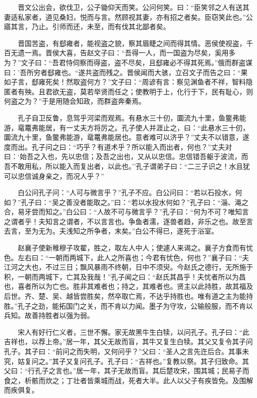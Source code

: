 　　晋文公出会，欲伐卫，公子锄仰天而笑。公问何笑。曰：``臣笑邻之人有送其妻适私家者，道见桑妇，悦而与言。然顾视其妻，亦有招之者矣。臣窃笑此也。''公寤其言，乃止。引师而还，未至，而有伐其北鄙者矣。

　　晋国苦盗，有郄雍者，能视盗之貌，察其眉睫之间而得其情。恶侯使视盗，千百无遗一焉。晋侯大喜，告赵文子曰：``吾得一人，而一国盗为尽矣，奚用多为？''文子曰：``吾君恃伺察而得盗，盗不尽矣，且郄雍必不得其死焉。''俄而群盗谋曰：'吾所穷者郄雍也。``遂共盗而残之。晋侯闻而大骇，立召文子而告之曰：``果如子言，郄雍死矣！然取盗何方？''文子曰：``周谚有言：察见渊鱼者不祥，智料隐匿者有殃。且君欲无盗，莫若举贤而任之；使教明于上，化行于下，民有耻心，则何盗之为？''于是用随会知政，而群盗奔秦焉。

　　孔子自卫反鲁，息驾乎河梁而观焉。有悬水三十仞，圜流九十里，鱼鳖弗能游，鼋鼍弗能居，有一丈夫方将厉之。孔子使人并涯止之，曰：``此悬水三十仞，圜流九十里，鱼鳖弗能游，鼋鼍弗能居也。意者难可以济乎？''丈夫不以错意，遂度而出。孔子问之曰：``巧乎？有道术乎？所以能入而出者，何也？''丈夫对曰：`始吾之入也，先以忠信；及吾之出也，又从以忠信。忠信错吾躯于波流，而吾不敢用私，所以能入而复出者，以此也。''孔子谓弟子曰：``二三子识之！水且犹可以忠信诚身亲之，而况人乎？''

　　白公问孔子问：``人可与微言乎？''孔子不应。白公问曰：``若以石投水，何如？''孔子曰：``吴之善没者能取之。''曰：``若以水投水何如？''孔子曰：``淄、渑之合，易牙尝而知之。''白公曰：``人故不可与微言乎？''孔子曰：``何为不可？唯知言之谓者乎！夫知言之谓者，不以言言也。争鱼者濡，逐兽者趋，非乐之也。故至言去言，至为无为。夫浅知之所争者，末矣。''白公不得已，遂死于浴室。

　　赵襄子使新稚穆子攻翟，胜之，取左人中人；使遽人来谒之。襄子方食而有忧色。左右曰：``一朝而两城下，此人之所喜也；今君有忧色，何也？''襄子曰：``夫江河之大也，不过三日；飘风暴雨不终朝，日中不须臾。今赵氏之德行，无所施于积，一朝而两城下，亡其及我哉！''孔子闻之曰：``赵氏其昌乎！夫忧者所以为昌也，喜者所以为亡也。胜非其难者也；持之，其难者也。贤主以此持胜，故其福及后世。齐、楚、吴、越皆尝胜矣，然卒取亡焉，不达乎持胜也。唯有道之主为能持胜。''孔子之劲，能拓国门之关，而不肯以力闻。墨子为守攻，公输般服，而不肯以兵知。故善持胜者以强为弱。

　　宋人有好行仁义者，三世不懈。家无故黑牛生白犊，以问孔子。孔子曰：``此吉祥也，以荐上帝。''居一年，其父无故而盲，其牛又复生白犊。其父又复令其子问孔子。其子曰：``前问之而失明，又何问乎？''父曰：``圣人之言先迕后合。其事未究，姑复问之。''其子又复问孔子。孔子曰：``吉祥也。''复教以祭。其子归致命。其父曰：``行孔子之言也。''居一年，其子无故而盲。其后楚攻宋，围其城；民易子而食之，析骸而炊之；丁壮者皆乘城而战，死者大半。此人以父子有疾皆免。及围解而疾俱复。


